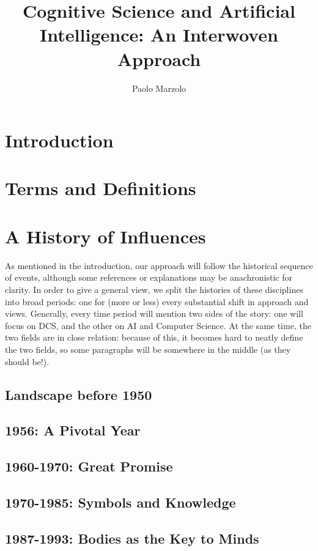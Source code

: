 \documentclass[oneside,notitlepage]{report}
\title{Cognitive Science and Artificial Intelligence: An Interwoven Approach}
\author{Paolo Marzolo}
\begin{document}


\tableofcontents
\newpage

\chapter{Introduction}


\chapter{Terms and Definitions}


\chapter{A History of Influences}
As mentioned in the introduction, our approach will follow the historical sequence of events, although some references or explanations may be anachronistic for clarity. In order to give a general view, we split the histories of these disciplines into broad periods: one for (more or less) every substantial shift in approach and views. Generally, every time period will mention two sides of the story: one will focus on DCS, and the other on AI and Computer Science. At the same time, the two fields are in close relation: because of this, it becomes hard to neatly define the two fields, so some paragraphs will be somewhere in the middle (as they should be!).

\section{Landscape before 1950}


\section{1956: A Pivotal Year}


\section{1960-1970: Great Promise}


\section{1970-1985: Symbols and Knowledge}


\section{1987-1993: Bodies as the Key to Minds}

\end{document}
